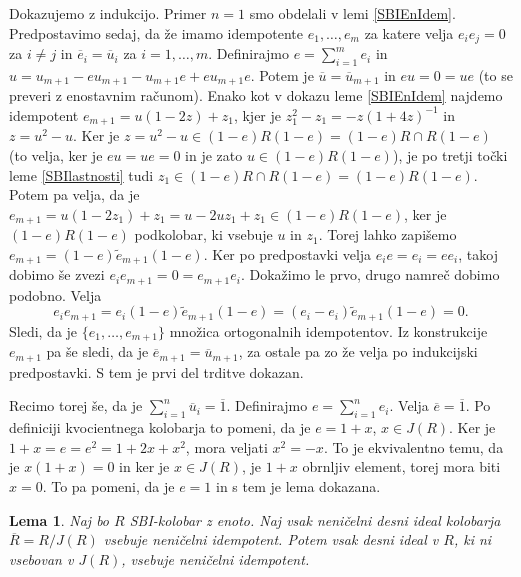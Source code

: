 \documentclass[a4paper, 12pt]{amsart}
\theoremstyle{definition} %
\theoremstyle{plain} %
\newtheorem{lema}[definicija]{Lema}
\begin{document}
\proof
Dokazujemo z indukcijo. Primer $n=1$ smo obdelali v lemi \ref{SBIEnIdem}. Predpostavimo sedaj, da že imamo idempotente $e_1,\dots,e_m$ za katere velja $e_i e_j = 0$ za $ i \neq j$ in $\overline{e}_i = \overline{u}_i$ za $i=1,\dots,m$. Definirajmo $e=\sum_{i=1}^m e_i$ in $u = u_{m+1} - eu_{m+1} - u_{m+1}e + eu_{m+1}e$. Potem je $\overline{u} = \overline{u}_{m+1}$ in $eu = 0 = ue$ (to se preveri z enostavnim računom). Enako kot v dokazu leme  \ref{SBIEnIdem} najdemo idempotent $e_{m+1} = u(1-2z) + z_1$, kjer je $z_1^2 - z_1 = -z(1+4z)^{-1}$ in $z = u^2 - u$. Ker je $z=u^2 - u\in (1-e) R(1-e) = (1-e)R\cap R(1-e)$ (to velja, ker je $eu=ue=0$ in je zato $u\in (1-e)R(1-e)$), je po tretji točki leme \ref{SBIlastnosti} tudi $z_1 \in (1-e) R\cap R(1-e) = (1-e)R(1-e)$. Potem pa velja, da je $e_{m+1} = u(1-2z_1) + z_1 = u - 2 uz_1 + z_1\in (1-e)R(1-e)$, ker je $(1-e)R(1-e)$ podkolobar, ki vsebuje $u$ in $z_1$. Torej lahko zapišemo $e_{m+1} = (1-e)\tilde{e}_{m+1}(1-e)$. Ker po predpostavki velja $e_i e =  e_i = e e_i$, takoj dobimo še zvezi $e_i e_{m+1} = 0 =e_{m+1} e_i$. Dokažimo le prvo, drugo namreč dobimo podobno. Velja
$$
e_i e_{m+1} = e_i (1-e) \tilde{e}_{m+1} (1-e) = (e_i - e_i) \tilde{e}_{m+1}(1-e) = 0.
$$
Sledi, da je $\{e_1, \dots, e_{m+1}\}$ množica ortogonalnih idempotentov. Iz konstrukcije $e_{m+1}$ pa še sledi, da je $\overline{e}_{m+1} =  \overline{u}_{m+1}$, za ostale pa zo že velja po indukcijski predpostavki. S tem je prvi del trditve dokazan. 

Recimo torej še, da je $\sum_{i=1}^n \overline{u}_i = \overline{1}$. Definirajmo $e= \sum_{i=1}^n e_i$. Velja $\overline{e} = \overline{1}$. Po definiciji kvocientnega kolobarja to pomeni, da je $e = 1+x$, $x\in J(R)$. Ker je $1+x=e=e^2 = 1+ 2x + x^2$, mora veljati $x^2 = -x$. To je ekvivalentno temu, da je 
$x(1+x) = 0$ in ker je $x\in J(R)$, je $1+x$ obrnljiv element, torej mora biti $x=0$. To pa pomeni, da je $e=1$ in s tem je lema dokazana.
\endproof

\begin{lema}
Naj bo $R$ SBI-kolobar z enoto. Naj vsak neničelni desni ideal kolobarja $\overline{R} = R/J(R)$ vsebuje neničelni idempotent. Potem vsak desni ideal v $R$, ki ni vsebovan v $J(R)$, vsebuje neničelni idempotent.
\end{lema}
\end{document}
